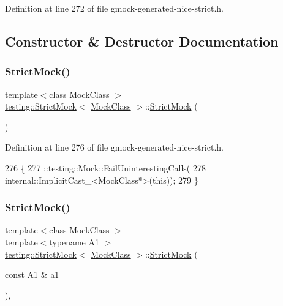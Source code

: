 Definition at line 272 of file gmock-\/generated-\/nice-\/strict.\+h.



\subsection{Constructor \& Destructor Documentation}
\mbox{\label{classtesting_1_1StrictMock_ad609d745db75306dd3b360b5410923fe}} 
\subsubsection{\texorpdfstring{Strict\+Mock()}{StrictMock()}\hspace{0.1cm}{\footnotesize\ttfamily [1/11]}}
{\footnotesize\ttfamily template$<$class Mock\+Class $>$ \\
\hyperlink{classtesting_1_1StrictMock}{testing\+::\+Strict\+Mock}$<$ \hyperlink{classMockClass}{Mock\+Class} $>$\+::\hyperlink{classtesting_1_1StrictMock}{Strict\+Mock} (\begin{DoxyParamCaption}{ }\end{DoxyParamCaption})\hspace{0.3cm}{\ttfamily [inline]}}



Definition at line 276 of file gmock-\/generated-\/nice-\/strict.\+h.


\begin{DoxyCode}
276                \{
277     ::testing::Mock::FailUninterestingCalls(
278         internal::ImplicitCast\_<MockClass*>(\textcolor{keyword}{this}));
279   \}
\end{DoxyCode}
\mbox{\label{classtesting_1_1StrictMock_a42db27ba0af29804db8589676817aff8}} 
\subsubsection{\texorpdfstring{Strict\+Mock()}{StrictMock()}\hspace{0.1cm}{\footnotesize\ttfamily [2/11]}}
{\footnotesize\ttfamily template$<$class Mock\+Class $>$ \\
template$<$typename A1 $>$ \\
\hyperlink{classtesting_1_1StrictMock}{testing\+::\+Strict\+Mock}$<$ \hyperlink{classMockClass}{Mock\+Class} $>$\+::\hyperlink{classtesting_1_1StrictMock}{Strict\+Mock} (\begin{DoxyParamCaption}\item[{const A1 \&}]{a1 }\end{DoxyParamCaption})\hspace{0.3cm}{\ttfamily [inline]}, {\ttfamily [explicit]}}



